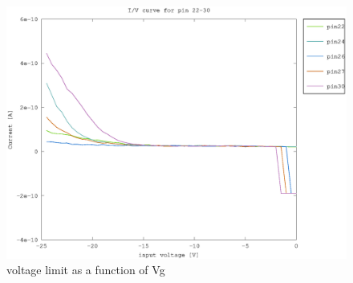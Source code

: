 \begin{figure}[h]
	    \centering
	    \includegraphics[width=\textwidth]{fig/pin22-30_slope_-25-0V.eps}
	    \caption[]%
	    {voltage limit as a function of Vg}    
	    \label{fig:vg_vs_vbo}	
\end{figure}



